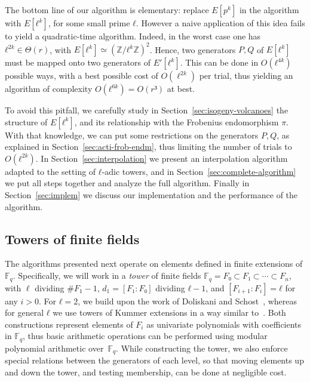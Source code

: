 \documentclass{lms}
\newcommand{\F}{\mathbb{F}}
\begin{document}
The bottom line of our algorithm is elementary: replace $E[p^k]$ in
the algorithm with $E[ℓ^k]$, for some small prime $ℓ$. However a
naive application of this idea fails to yield a quadratic-time
algorithm. Indeed, in the worst case one has $ℓ^{2k}∈\Theta(r)$, with
$E[ℓ^k]≃(ℤ/ℓ^kℤ)^2$. Hence, two generators $P,Q$ of $E[ℓ^k]$ must
be mapped onto two generators of $E'[ℓ^k]$. This can be done in
$O(ℓ^{4k})$ possible ways, with a best possible cost of $O(\ell^{2k})$
per trial,
thus yielding an
algorithm of complexity $O(ℓ^{6k})=O(r³)$ at best.

To avoid this pitfall, we carefully study
in Section~\ref{sec:isogeny-volcanoes} the structure of
$E[ℓ^k]$, and its relationship with the Frobenius endomorphism $π$.
With that knowledge, we can put some restrictions on the generators $P,Q$,
as explained in Section~\ref{sec:acti-frob-endm},
thus limiting the number of trials to $O(ℓ^{2k})$.
In Section~\ref{sec:interpolation}
we present an interpolation algorithm adapted to the setting of
$ℓ$-adic towers, and in Section~\ref{sec:complete-algorithm} we put
all steps together and analyze the full algorithm. Finally in
Section~\ref{sec:implem} we discuss our implementation and the
performance of the algorithm.



\subsection{Towers of finite fields}
\label{sub:towers}

The algorithms presented next operate on elements defined in finite
extensions of $\F_q$. Specifically, we will work in a \emph{tower} of finite
fields $\F_q=F₀⊂F₁⊂\cdots⊂F_n$, with $\ell$ dividing $\#F_1-1$, $d_1=[F₁:F₀]$
dividing $ℓ-1$, and $[F_{i+1}:F_i]=ℓ$ for any $i>0$. For $ℓ=2$,
we build upon the work of Doliskani and Schost~\cite{DoSc12}, whereas for
general $ℓ$ we use towers of Kummer extensions in a way similar
to~\cite[\S2]{DeDoSc13}.  Both constructions represent elements of
$F_i$ as univariate polynomials with coefficients in $\F_q$, thus
basic arithmetic operations can be performed using modular
polynomial arithmetic over~$\F_q$. While constructing the tower, we also enforce
special relations between the generators of each level, so that moving
elements up and down the tower, and testing membership, can be done at
negligible cost.
\end{document}
